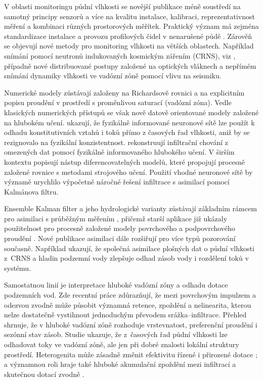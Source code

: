 \documentclass[11pt,a4paper]{article}
\begin{document}
\begin{onehalfspacing}
V oblasti monitoringu půdní vlhkosti se novější publikace méně soustředí na
samotný principy senzorů a více na kvalitu instalace, kalibraci, reprezentativnost měření a kombinaci různých prostorových měřítek. Praktický význam má zejména standardizace instalace a provozu profilových čidel v nenarušené půdě \parencite{CaldwellEtAl2022}. 
Zárověň se objevují nové metody pro monitoring vlhkosti na větších oblastech. Například snímání pomocí neutronů indukovaných kosmickým zářením (CRNS), viz
\cite{RascheEtAl2024CRNS}, případně nové distribuované postupy založené na
optických vláknech a nepřímém snímání dynamiky vlhkosti ve vadózní zóně
\parencite{ShenEtAl2024Fiber} pomocí vlivu na seismiku. 

Numerické modely zůstávají založeny na Richardsově rovnici a na explicitním popisu proudění v prostředí s proměnlivou saturací (vadózní zóna). Vedle klasických numerických přístupů se však nově datově orientované modely založené na hlubokém učení. \textcite{Bandai_Ghezzehei_2021} ukazují, že fyzikálně informované neuronové
sítě lze použít k odhadu konstitutivních vztahů i toků přímo z časových řad
vlhkosti, aniž by se rezignovalo na fyzikální konzistentnost.
\textcite{LanEtAl2024PIDL} rekonstruují infiltrační chování z omezených dat
pomocí fyzikálně informovaného hlubokého učení. V širším kontextu
\textcite{ShenEtAl2023Differentiable} popisují nástup diferencovatelných
modelů, které propojují procesně založené rovnice s metodami strojového učení.
Použití vhodné neuronové sítě by významě urychlilo výpočetně náročné řešení infiltrace s asimilací pomocí Kalmánova filtru.

Ensemble Kalman filter a jeho hydrologické varianty
zůstávají základním rámcem pro asimilaci s průběžným měřením \parencite{Evensen2003}, přičemž starší aplikace již
ukázaly použitelnost pro procesně založené modely povrchového a podpovrchového
proudění \parencite{Camporese2009,Carlo2018}. Nové publikace asimilaci dále rozšiřují  pro více typů pozorování současně. Například \textcite{LiEtAl2025JointAssimilation}
ukazují, že společná asimilace plošných dat o půdní vlhkosti z~CRNS a
hladin podzemní vody zlepšuje odhad zásob vody i rozdělení toků v systému.

Samostatnou linií je interpretace hluboké vadózní zóny a odhadu dotace
podzemních vod. Zde recentní práce zdůrazňují, že mezi povrchovým impulzem a
odezvou zvodně může působit významná retence, zpoždění a nelinearita, kterou
nelze dostatečně vystihnout jednoduchým převodem srážka--infiltrace. Přehled
\textcite{HeEtAl2024DeepVadoseReview} shrnuje, že v hluboké vadózní zóně
rozhoduje vrstevnatost, preferenční proudění i sezónní stav zásob. Studie \textcite{SchueblEtAl2023} ukazuje, že z~časových řad půdní vlhkosti lze odhadovat
toky ve vadózní zóně, ale jen při dobré znalosti lokální struktury prostředí.
Heterogenita může zásadně změnit efektivitu řízené i
přirozené dotace \parencite{ZhouEtAl2023VadoseMAR}; a významnou roli hraje také
hluboké akumulační zpoždění mezi infiltrací a skutečnou dotací zvodně
\parencite{LiEtAl2023LoessRecharge,BenitezNelsonEtAl2025}.


\end{onehalfspacing}
\end{document}
